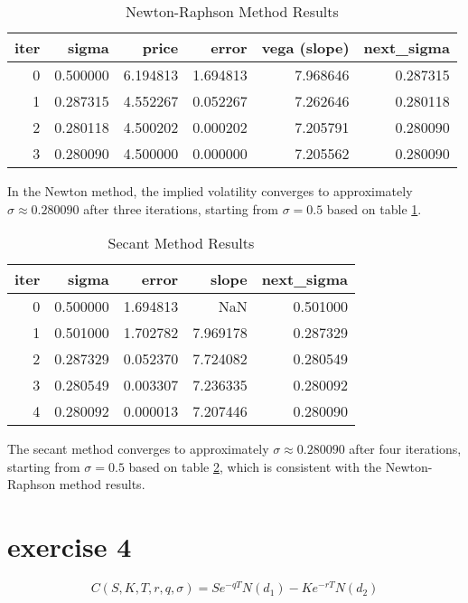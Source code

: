 \documentclass{article}
\begin{document}
\begin{table}
    \centering
    \caption{Newton-Raphson Method Results}
    \label{tab:newton_results}
    \begin{tabular}{rrrrrr}
        \toprule
        iter & sigma    & price    & error    & vega (slope) & next\_sigma \\
        \midrule
        0    & 0.500000 & 6.194813 & 1.694813 & 7.968646     & 0.287315    \\
        1    & 0.287315 & 4.552267 & 0.052267 & 7.262646     & 0.280118    \\
        2    & 0.280118 & 4.500202 & 0.000202 & 7.205791     & 0.280090    \\
        3    & 0.280090 & 4.500000 & 0.000000 & 7.205562     & 0.280090    \\
        \bottomrule
    \end{tabular}
\end{table}

In the Newton method, the implied volatility converges to approximately \( \sigma \approx 0.280090 \)
after three iterations, starting from \( \sigma = 0.5 \) based on table \ref{tab:newton_results}.

\begin{table}
    \centering
    \caption{Secant Method Results}
    \label{tab:secant_results}
    \begin{tabular}{rrrrr}
        \toprule
        iter & sigma    & error    & slope    & next\_sigma \\
        \midrule
        0    & 0.500000 & 1.694813 & NaN      & 0.501000    \\
        1    & 0.501000 & 1.702782 & 7.969178 & 0.287329    \\
        2    & 0.287329 & 0.052370 & 7.724082 & 0.280549    \\
        3    & 0.280549 & 0.003307 & 7.236335 & 0.280092    \\
        4    & 0.280092 & 0.000013 & 7.207446 & 0.280090    \\
        \bottomrule
    \end{tabular}
\end{table}
The secant method converges to approximately \( \sigma \approx 0.280090 \)
after four iterations, starting from \( \sigma = 0.5 \) based on table \ref{tab:secant_results},
which is consistent with the Newton-Raphson method results.

\section{exercise 4}
\[
    C(S, K, T, r, q, \sigma) = S e^{-qT} N(d_1) - K e^{-rT} N(d_2)
\]
\end{document}
